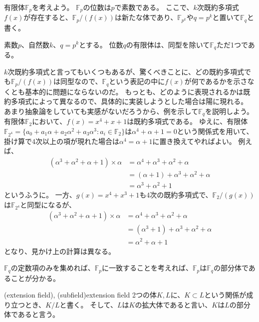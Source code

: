 有限体$\mathbb{F}_p$を考えよう。
$\mathbb{F}_p$の位数は$p$で素数である。
ここで、$k$次既約多項式$f(x)$が存在すると、$\mathbb{F}_p/(f(x))$は新たな体であり、$\mathbb{F}_{p^k}$や$q=p^k$と置いて$\mathbb{F}_q$と書く。

\begin{Theo}{}{}
素数$p$、自然数$k$、$q=p^k$とする。
位数$q$の有限体は、同型を除いて$\mathbb{F}_q$ただ1つである。
\end{Theo}

$k$次既約多項式と言ってもいくつもあるが、驚くべきことに、どの既約多項式でも$\mathbb{F}_p/(f(x))$は同型なので、$\mathbb{F}_q$という表記の中に$f(x)$が何であるかを示さなくとも基本的に問題にならないのだ。
もっとも、どのように表現されるかは既約多項式によって異なるので、具体的に実装しようとした場合は陽に現れる。
あまり抽象論をしていても実感がないだろうから、例を示して$\mathbb{F}_q$を説明しよう。
有限体$\mathbb{F}_2$において、$f(x)=x^4+x+1$は既約多項式である。
ゆえに、有限体$\mathbb{F}_{2^4}=\{a_0 + a_1\alpha + a_2\alpha^2 + a_3\alpha^3 : a_i \in \mathbb{F}_2\}$は$\alpha^4+\alpha+1=0$という関係式を用いて、掛け算で4次以上の項が現れた場合は$\alpha^4=\alpha+1$に置き換えてやればよい。
例えば、
\begin{align*}
(\alpha^3 + \alpha^2 + \alpha + 1) \times \alpha &= \alpha^4 + \alpha^3 + \alpha^2 + \alpha\\
 &= (\alpha + 1) + \alpha^3 + \alpha^2 + \alpha\\
 &= \alpha^3 + \alpha^2 + 1
\end{align*}
というふうに。
一方、$g(x)=x^4+x^3+1$も4次の既約多項式で、$\mathbb{F}_2/(g(x))$は$\mathbb{F}_{2^4}$と同型になるが、
\begin{align*}
(\alpha^3 + \alpha^2 + \alpha + 1) \times \alpha &= \alpha^4 + \alpha^3 + \alpha^2 + \alpha\\
 &= (\alpha^3 + 1) + \alpha^3 + \alpha^2 + \alpha\\
 &= \alpha^2 + \alpha + 1
\end{align*}
となり、見かけ上の計算は異なる。

$\mathbb{F}_q$の定数項のみを集めれば、$\mathbb{F}_p$に一致することを考えれば、$\mathbb{F}_p$は$\mathbb{F}_q$の部分体であることが分かる。

\begin{Defi}{(extension field), (subfield)}{extension field}
2つの体$K, L$に、$K\subset L$という関係が成り立つとき、$K/L$と書く。
そして、$L$は$K$の拡大体であると言い、$K$は$L$の部分体であると言う。
\end{Defi}

